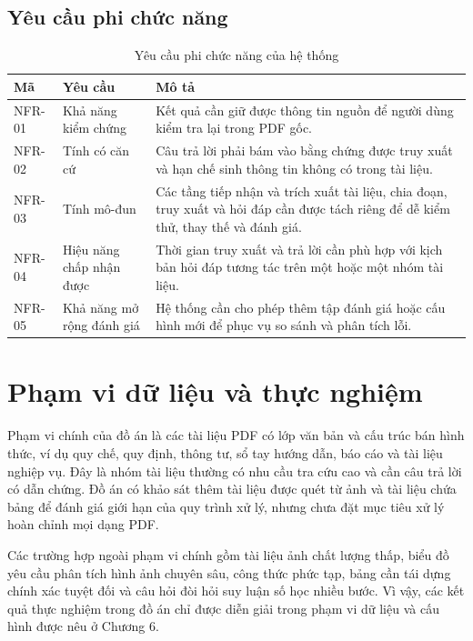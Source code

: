 \documentclass[../DoAn.tex]{subfiles}
\begin{document}
\subsection{Yêu cầu phi chức năng}

\begin{table}[H]
\centering
\small
\renewcommand{\arraystretch}{1.2}
\caption{Yêu cầu phi chức năng của hệ thống}
\label{tab:non-functional-requirements}
\begin{tabularx}{\textwidth}{
    |>{\centering\arraybackslash}p{}
    |>{\raggedright\arraybackslash}p{}
    |>{\raggedright\arraybackslash}X|
}
\hline
\textbf{Mã} & \textbf{Yêu cầu} & \textbf{Mô tả} \\
\hline
NFR-01 & Khả năng kiểm chứng &
Kết quả cần giữ được thông tin nguồn để người dùng kiểm tra lại trong PDF gốc. \\
\hline
NFR-02 & Tính có căn cứ &
Câu trả lời phải bám vào bằng chứng được truy xuất và hạn chế sinh thông tin
không có trong tài liệu. \\
\hline
NFR-03 & Tính mô-đun &
Các tầng tiếp nhận và trích xuất tài liệu, chia đoạn, truy xuất và hỏi đáp cần được tách riêng để dễ kiểm thử,
thay thế và đánh giá. \\
\hline
NFR-04 & Hiệu năng chấp nhận được &
Thời gian truy xuất và trả lời cần phù hợp với kịch bản hỏi đáp tương tác trên
một hoặc một nhóm tài liệu. \\
\hline
NFR-05 & Khả năng mở rộng đánh giá &
Hệ thống cần cho phép thêm tập đánh giá hoặc cấu hình mới để phục vụ so sánh và
phân tích lỗi. \\
\hline
\end{tabularx}
\end{table}

\section{Phạm vi dữ liệu và thực nghiệm}
\label{section:data-and-experiment-scope}

Phạm vi chính của đồ án là các tài liệu PDF có lớp văn bản và cấu trúc bán hình
thức, ví dụ quy chế, quy định, thông tư, sổ tay hướng dẫn, báo cáo và tài liệu
nghiệp vụ. Đây là nhóm tài liệu thường có nhu cầu tra cứu cao và cần câu trả lời
có dẫn chứng. Đồ án có khảo sát thêm tài liệu được quét từ ảnh và tài liệu chứa
bảng để đánh giá giới hạn của quy trình xử lý, nhưng chưa đặt mục tiêu xử lý hoàn chỉnh
mọi dạng PDF.

Các trường hợp ngoài phạm vi chính gồm tài liệu ảnh chất lượng thấp, biểu đồ yêu
cầu phân tích hình ảnh chuyên sâu, công thức phức tạp, bảng cần tái dựng chính
xác tuyệt đối và câu hỏi đòi hỏi suy luận số học nhiều bước. Vì vậy, các kết quả
thực nghiệm trong đồ án chỉ được diễn giải trong phạm vi dữ liệu và cấu hình được
nêu ở Chương 6.
\end{document}
